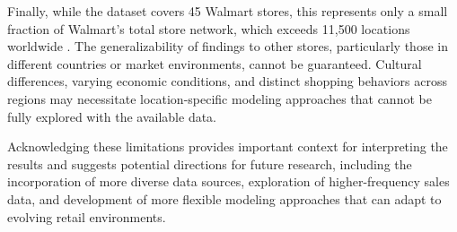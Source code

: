 Finally, while the dataset covers 45 Walmart stores, this represents only a small fraction of Walmart's total store network, which exceeds 11,500 locations worldwide \cite{Zhang:2021}. The generalizability of findings to other stores, particularly those in different countries or market environments, cannot be guaranteed. Cultural differences, varying economic conditions, and distinct shopping behaviors across regions may necessitate location-specific modeling approaches that cannot be fully explored with the available data.

Acknowledging these limitations provides important context for interpreting the results and suggests potential directions for future research, including the incorporation of more diverse data sources, exploration of higher-frequency sales data, and development of more flexible modeling approaches that can adapt to evolving retail environments.
